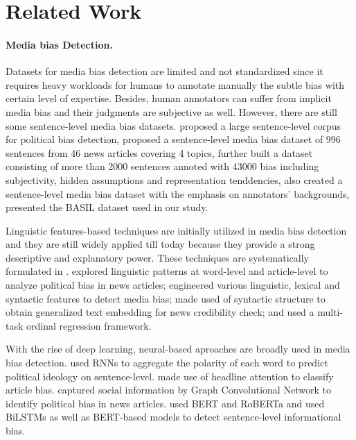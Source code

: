 \section{Related Work}

\paragraph{Media bias Detection.} 
Datasets for media bias detection are limited and not standardized since it requires heavy workloads for humans to annotate manually the subtle bias with certain level of expertise. Besides, human annotators can suffer from implicit media bias and their judgments are subjective as well. However, there are still some sentence-level media bias datasets. \citet{wei2020newb} proposed a large sentence-level corpus for political bias detection, \citet{lim-etal-2020-annotating} proposed a sentence-level media bias dataset of 996 sentences from 46 news articles covering 4 topics, \citet{10.1145/3366423.3380158} further built a dataset consisting of more than 2000 sentences annoted with 43000 bias including subjectivity, hidden assumptions and representation tenddencies, \citet{spinde2021mbic} also created a sentence-level media bias dataset with the emphasis on annotators' backgrounds, \citet{fan-etal-2019-plain} presented the BASIL dataset used in our study.

Linguistic features-based techniques are initially utilized in media bias detection and they are still widely applied till today because they provide a strong descriptive and explanatory power. These techniques are systematically formulated in \citep{recasens-etal-2013-linguistic}. \citep{chen-etal-2020-analyzing} explored linguistic patterns at word-level and article-level to analyze political bias in news articles; \citet{SPINDE2021102505} engineered various linguistic, lexical and syntactic features to detect media bias; \citet{10.1145/3366423.3380158} made used of syntactic structure to obtain generalized text embedding for news credibility check; and \citet{baly-etal-2019-multi} used a multi-task ordinal regression framework.

With the rise of deep learning, neural-based aproaches are broadly used in media bias detection. \citet{iyyer-etal-2014-political} used RNNs to aggregate
the polarity of each word to predict political ideology on sentence-level. \citet{gangula-etal-2019-detecting}
made use of headline attention to classify article
bias. \citet{li-goldwasser-2019-encoding} captured social information by Graph Convolutional Network to identify political bias in news articles. \citet{fan-etal-2019-plain} used BERT and RoBERTa and \citet{van-den-berg-markert-2020-context} used BiLSTMs as well as BERT-based models to detect sentence-level informational bias.

